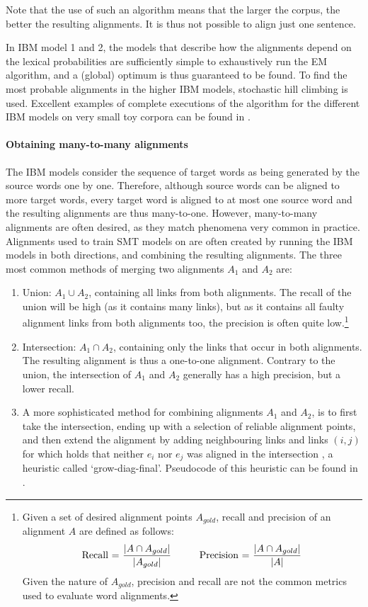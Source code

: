 \noindent Note that the use of such an algorithm means that the larger the corpus, the better the resulting alignments. It is thus not possible to align just one sentence.

In IBM model 1 and 2, the models that describe how the alignments depend on the lexical probabilities are sufficiently simple to exhaustively run the EM algorithm, and a (global) optimum is thus guaranteed to be found. To find the most probable alignments in the higher IBM models, stochastic hill climbing is used. Excellent examples of complete executions of the algorithm for the different IBM models on very small toy corpora can be found in \cite[p88-113]{koehn2008statistical}.

\paragraph{Obtaining many-to-many alignments}
The IBM models consider the sequence of target words as being generated by the source words one by one. Therefore, although source words can be aligned to more target words, every target word is aligned to at most one source word and the resulting alignments are thus many-to-one. However, many-to-many alignments are often desired, as they match phenomena very common in practice. Alignments used to train SMT models on are often created by running the IBM models in both directions, and combining the resulting alignments. The three most common methods of merging two alignments $A_1$ and $A_2$ are:\begin{enumerate}
\item Union: $A_1\cup A_2$, containing all links from both alignments. The recall of the union will be high (as it contains many links), but as it contains all faulty alignment links from both alignments too, the precision is often quite low.\footnote{Given a set of desired alignment points $A_{gold}$, recall and precision of an alignment $A$ are defined as follows:\\
$$\text{Recall = }\frac{|A \cap A_{gold}|}{|A_{gold}|} \text{\hspace{10mm}Precision = }\frac{|A \cap A_{gold}|}{|A|}$$
Given the nature of $A_{gold}$, precision and recall are not the common metrics used to evaluate word alignments.}
\item Intersection: $A_1\cap A_2$, containing only the links that occur in both alignments. The resulting alignment is thus a one-to-one alignment. Contrary to the union, the intersection of $A_1$ and $A_2$ generally has a high precision, but a lower recall.
\item A more sophisticated method for combining alignments $A_1$ and $A_2$, is to first take the intersection, ending up with a selection of reliable alignment points, and then extend the alignment by adding neighbouring links and links $(i,j)$ for which holds that neither $e_i$ nor $e_j$ was aligned in the intersection \citep{och2000improved}, a heuristic called `grow-diag-final'. Pseudocode of this heuristic can be found in \cite{koehn2008statistical}.
\end{enumerate}

